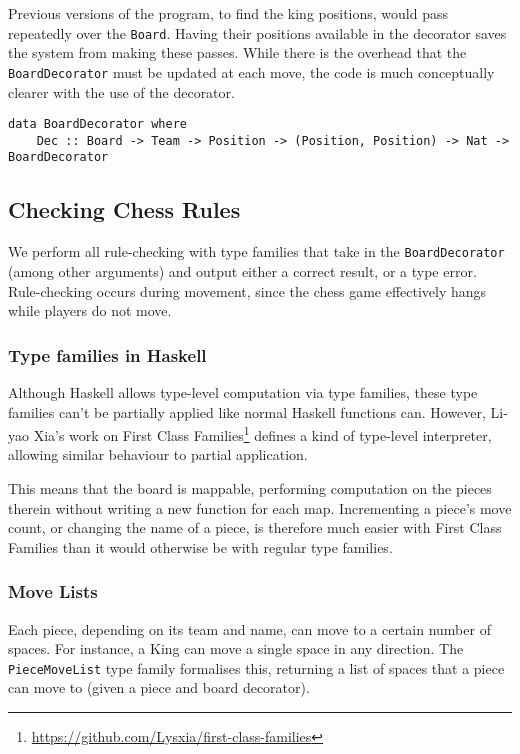\documentclass[12pt, a4paper, bibliography=totocnumbered]{scrartcl}
\begin{document}
Previous versions of the program, to find the king positions, would pass repeatedly over the \lstinline{Board}. Having their positions available in the decorator saves the system from making these passes. While there is the overhead that the \lstinline{BoardDecorator} must be updated at each move, the code is much conceptually clearer with the use of the decorator.

\begin{lstlisting}
data BoardDecorator where
    Dec :: Board -> Team -> Position -> (Position, Position) -> Nat -> BoardDecorator
\end{lstlisting}

\subsection{Checking Chess Rules}

We perform all rule-checking with type families that take in the \lstinline{BoardDecorator} (among other arguments) and output either a correct result, or a type error. Rule-checking occurs during movement, since the chess game effectively hangs while players do not move.

\subsubsection{Type families in Haskell}

Although Haskell allows type-level computation via type families, these type families can't be partially applied like normal Haskell functions can. However, Li-yao Xia's work on First Class Families\footnote{\url{https://github.com/Lysxia/first-class-families}} defines a kind of type-level interpreter, allowing similar behaviour to partial application.

This means that the board is mappable, performing computation on the pieces therein without writing a new function for each map. Incrementing a piece's move count, or changing the name of a piece, is therefore much easier with First Class Families than it would otherwise be with regular type families.

\subsubsection{Move Lists}

Each piece, depending on its team and name, can move to a certain number of spaces. For instance, a King can move a single space in any direction. The \lstinline{PieceMoveList} type family formalises this, returning a list of spaces that a piece can move to (given a piece and board decorator).
\end{document}
